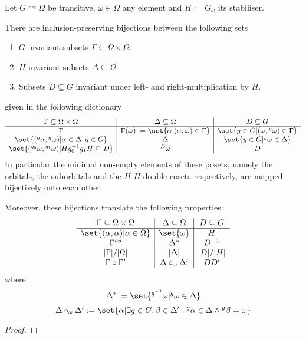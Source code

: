 \documentclass[fontsize=11pt,fleqn,a4paper]{scrartcl}
\begin{document}
\begin{theorem}
Let $G \curvearrowright \Omega$ be transitive, $\omega\in\Omega$ any element and $H:=G_\omega$ its stabiliser.

There are inclusion-preserving bijections between the following sets
\begin{enumerate}
\item $G$-invariant subsets $\Gamma\subseteq\Omega\times\Omega$.
\item $H$-invariant subsets $\Delta\subseteq\Omega$
\item Subsets $D\subseteq G$ invariant under left- and right-multiplication by $H$.
\end{enumerate}
given in the following dictionary
\[\begin{array}{c|c|c}
\Gamma\subseteq\Omega\times\Omega & \Delta\subseteq\Omega & D\subseteq G \\
\hline
\Gamma & \Gamma(\omega) := \set{\alpha | (\alpha,\omega)\in\Gamma} & \set{ y\in G | (\omega,{^y \omega})\in\Gamma} \\
\set{({^g \alpha},{^g \omega}) | \alpha\in\Delta,g\in G} & \Delta & \set{y\in G | {^y \omega}\in\Delta} \\
\set{({^{g_0}\omega}, {^{g_1}\omega}) | Hg_0^{-1} g_1 H \subseteq D} & {^D\omega} & D \\
\end{array}\]
In particular the minimal non-empty elements of these posets, namely the orbitals, the suborbitals and the $H$-$H$-double cosets respectively, are mapped bijectively onto each other.

Moreover, these bijections translate the following properties:
\[\begin{array}{c|c|c}
\Gamma\subseteq\Omega\times\Omega & \Delta\subseteq\Omega & D\subseteq G \\
\hline
\set{(\alpha,\alpha) | \alpha\in\Omega} & \set{\omega} & H \\
\Gamma^{op} & \Delta^\ast & D^{-1} \\
\abs{\Gamma}/\abs{\Omega} & \abs{\Delta} & \abs{D}/\abs{H} \\
\Gamma \circ \Gamma' & \Delta \circ_\omega \Delta' & DD'
\end{array}\]
where
\[\Delta^\ast :=\set{{^{g^{-1}}\omega} | {^g \omega}\in\Delta}\]
\[\Delta \circ_\omega \Delta' := \set{\alpha | \exists g\in G, \beta\in\Delta': {^g \alpha}\in\Delta \wedge {^g\beta}=\omega}\]
\end{theorem}
\begin{proof}
\end{proof}
\end{document}
